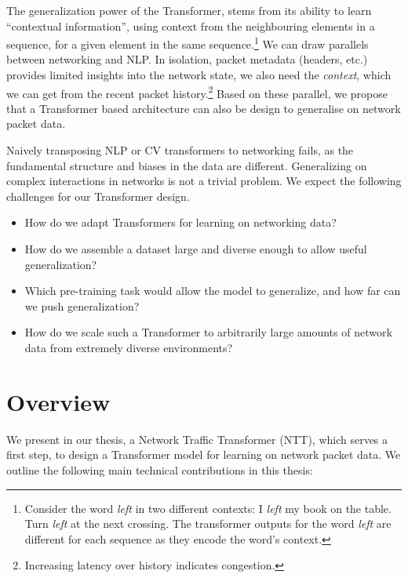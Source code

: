 The generalization power of the Transformer, stems from its ability to learn ``contextual information'', using context from the neighbouring elements in a sequence, for a given element in the same sequence\cite{devlinBERTPretrainingDeep2019}.\footnote{Consider the word \emph{left} in two different contexts: I \emph{left} my book on the table. Turn \emph{left} at the next crossing. The transformer outputs for the word \emph{left} are different for each sequence as they encode the word's context.}
We can draw parallels between networking and NLP. In isolation, packet metadata (headers, etc.) provides limited insights into the network state, we also need the \emph{context}, \ie which we can get from the recent packet history.\footnote{Increasing latency over history indicates congestion.} Based on these parallel, we propose that a Transformer based architecture can also be design to generalise on network packet data. 

Naively transposing NLP or CV transformers to networking fails, as the fundamental structure and biases\cite{biases} in the data are different. Generalizing on complex interactions in networks is not a trivial problem. We expect the following challenges for our Transformer design.

\begin{itemize}
    \item
          How do we adapt Transformers for learning on networking data?
    \item
          How do we assemble a dataset large and diverse enough to allow useful generalization?
    \item
          Which pre-training task would allow the model to generalize, and how far can we push generalization?
    \item 
    	 How do we scale such a Transformer to arbitrarily large amounts of network data from extremely diverse environments?
\end{itemize}

\section{Overview}
\label{sec:overview}

We present in our thesis, a Network Traffic Transformer (NTT), which serves a first step, to design a Transformer model for learning on network packet data. We outline the following main technical contributions in this thesis:

